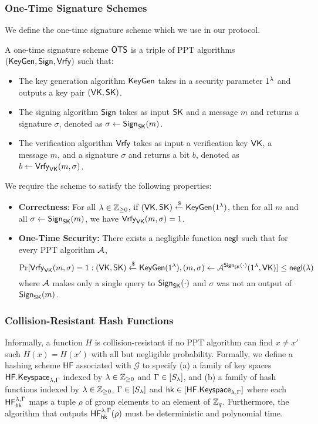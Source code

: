\subsubsection{One-Time Signature Schemes} We define the one-time signature scheme which we use in our protocol. 

\begin{definition}
	A one-time signature scheme $\mathsf{OTS}$ is a triple of PPT algorithms $(\mathsf{KeyGen},\mathsf{Sign},\mathsf{Vrfy})$ such that:
	\begin{itemize}
		\item The key generation algorithm $\mathsf{KeyGen}$ takes in a security parameter $1^\lambda$ and outputs a key pair $(\mathsf{VK},\mathsf{SK})$.
		\item The signing algorithm $\mathsf{Sign}$ takes as input $\mathsf{SK}$ and a message $m$ and returns a signature $\sigma$, denoted as $\sigma\gets\mathsf{Sign}_{\mathsf{SK}}(m)$.
		\item The verification algorithm $\mathsf{Vrfy}$ takes as input a verification key $\mathsf{VK}$, a message $m$, and a signature $\sigma$ and returns a bit $b$, denoted as $b\gets\mathsf{Vrfy}_{\mathsf{VK}}(m,\sigma)$.
	\end{itemize}
	We require the scheme to satisfy the following properties:
	\begin{itemize}
		\item \textbf{Correctness}: For all $\lambda\in\mathbb{Z}_{\geq 0}$, if $(\mathsf{VK},\mathsf{SK})\xleftarrow{\$}\mathsf{KeyGen}(1^\lambda)$, then for all $m$ and all $\sigma\gets\mathsf{Sign}_{\mathsf{SK}}(m)$, we have $\mathsf{Vrfy}_{\mathsf{VK}}(m,\sigma)=1$.
		\item \textbf{One-Time Security:} There exists a negligible function $\mathsf{negl}$ such that for every PPT algorithm $\mathcal{A}$, $$\Pr[\mathsf{Vrfy}_{\mathsf{VK}}(m,\sigma)=1: (\mathsf{VK},\mathsf{SK})\xleftarrow{\$}\mathsf{KeyGen}(1^\lambda), (m,\sigma)\gets\mathcal{A}^{\mathsf{Sign}_{\mathsf{SK}}(\cdot)}(1^\lambda,\mathsf{VK})]\leq\mathsf{negl}(\lambda)$$ where $\mathcal{A}$ makes only a single query to $\mathsf{Sign}_{\mathsf{SK}}(\cdot)$ and $\sigma$ was not an output of $\mathsf{Sign}_{\mathsf{SK}}(m)$.
	\end{itemize}
\end{definition}

\subsubsection{Collision-Resistant Hash Functions}

Informally, a function $H$ is collision-resistant if no PPT algorithm can find $x\neq x'$ such $H(x)=H(x')$ with all but negligible probability. Formally, we define a hashing scheme $\mathsf{HF}$ associated with $\mathcal{G}$ to specify (a) a family of key spaces $\mathsf{HF.Keyspace}_{\lambda,\Gamma}$ indexed by $\lambda\in\mathbb{Z}_{\geq 0}$ and $\Gamma\in[S_\lambda]$, and (b) a family of hash functions indexed by $\lambda\in\mathbb{Z}_{\geq 0}$, $\Gamma\in[S_\lambda]$ and $\mathsf{hk}\in[\mathsf{HF.Keyspace}_{\lambda,\Gamma}]$ where each $\mathsf{HF}_{\mathsf{hk}}^{\lambda,\Gamma}$ maps a tuple $\rho$ of group elements to an element of $\mathbb{Z}_q$. Furthermore, the algorithm that outputs $\mathsf{HF}_{\mathsf{hk}}^{\lambda,\Gamma}(\rho)$ must be deterministic and polynomial time.

